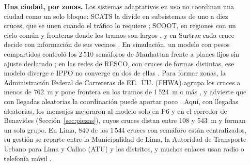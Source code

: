 \noindent\textbf{Una ciudad, por zonas.} Los sistemas adaptativos en uso
no coordinan una ciudad como un solo bloque: SCATS la divide en
subsistemas de uno a diez cruces, que se unen cuando el tráfico lo
requiere \citep{PIARC_UTC}; SCOOT, en regiones con un ciclo común y
fronteras donde los tramos son largos \citep{DETR1999_SCOOT}, y en
Surtrac cada cruce decide con información de sus vecinos
\citep{Smith2013_Surtrac}. En simulación, un modelo con pesos
compartidos controló los 2\,510 semáforos de Manhattan frente a planes
fijos sin ajuste declarado \citep{Chen2020_MPLight}; en las redes de
RESCO, con cruces de formas distintas, ese modelo diverge e IPPO no
converge en dos de ellas \citep{Ault2021_RESCO}. Para formar zonas, la
Administración Federal de Carreteras de EE.~UU. (FHWA) agrupa los
cruces a menos de 762~m y pone frontera en los tramos de 1\,524~m o más
\citep{FHWA2005_Shoestring}, y advierte que con llegadas aleatorias la
coordinación puede aportar poco \citep{FHWA2008_TimingManual_Cap6}.
Aquí, con llegadas aleatorias, los mensajes mejoraron al modelo solo en
P6 y en el corredor de Benavides (Sección~\ref{sec:piezas}), cuyos
cruces distan entre 108 y 543~m y forman un solo grupo.
En Lima, 840 de los
1\,544 cruces con semáforo están centralizados, su gestión se reparte
entre la Municipalidad de Lima, la Autoridad de Transporte Urbano para
Lima y Callao (ATU) y los distritos, y muchos enlaces usan radio o
telefonía móvil \citep{BancoMundial2024_PAD}.
